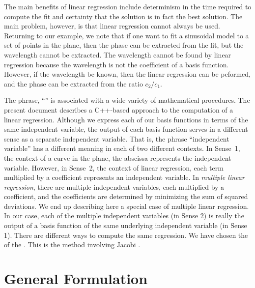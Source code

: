 \documentclass[twocolumn]{article}
\begin{document}
The main benefits of linear regression include determinism in the time required
to compute the fit and certainty that the solution is in fact the best
solution. The main problem, however, is that linear regression cannot always be
used.  Returning to our example, we note that if one want to fit a sinusoidal
model to a set of points in the plane, then the phase can be extracted from the
fit, but the wavelength cannot be extracted. The wavelength cannot be found by
linear regression because the wavelength is not the coefficient of a basis
function.  However, if the wavelength be known, then the linear regression can
be peformed, and the phase can be extracted from the ratio $c_2/c_1$.

The phrase, ``'' is associated
with a wide variety of mathematical procedures. The present document describes
a C++-based approach to the computation of a linear regression.  Although we
express each of our basis functions in terms of the same independent variable,
the output of each basis function serves in a different sense as a separate
independent variable. That is, the phrase ``independent variable'' has a
different meaning in each of two different contexts. In Sense~1, the context of
a curve in the plane, the abscissa represents the independent variable.
However, in Sense~2, the context of linear regression, each term multiplied by
a coefficient represents an independent variable. In \emph{multiple linear
regression}, there are multiple independent variables, each multiplied by a
coefficient, and the coefficients are determined by minimizing the sum of
squared deviations.  We end up describing here a special case of multiple
linear regression. In our case, each of the multiple independent variables (in
Sense 2) is really the output of a basis function of the same underlying
independent variable (in Sense 1).  There are different ways to compute the
same regression. We have chosen the 
of the .  This is the
method involving Jacobi .

\section{General Formulation}
\end{document}

